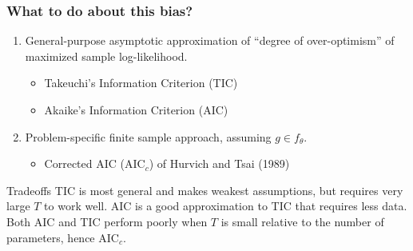 \begin{frame}
  \frametitle{What to do about this bias?}

  \begin{enumerate}
    \item General-purpose asymptotic approximation of ``degree of over-optimism'' of maximized sample log-likelihood.
      \begin{itemize}
        \item Takeuchi's Information Criterion (TIC)
        \item Akaike's Information Criterion (AIC)
      \end{itemize}
      \pause
    \item Problem-specific finite sample approach, assuming $g \in f_\theta$.
      \begin{itemize}
        \item Corrected AIC (AIC$_c$) of Hurvich and Tsai (1989)
      \end{itemize}
  \end{enumerate}

  \pause
  \begin{alertblock}{Tradeoffs}
   TIC is most general and makes weakest assumptions, but requires very large $T$ to work well. 
   AIC is a good approximation to TIC that requires less data.
   Both AIC and TIC perform poorly when $T$ is small relative to the number of parameters, hence AIC$_c$.
  \end{alertblock}

\end{frame}
